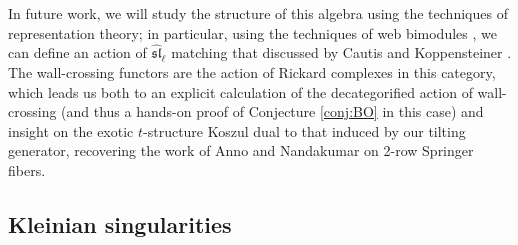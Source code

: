 In future work, we will study the structure of this algebra using the techniques of representation theory; in particular, using the techniques of web bimodules \cite{Webweb}, we can define an action of $\mathfrak{\widehat{sl}}_\ell$ matching that discussed by Cautis and Koppensteiner \cite{CKexotic}.  The wall-crossing functors are the action of Rickard complexes in this category, which leads us both to an explicit calculation of the decategorified action of wall-crossing (and thus a hands-on proof of Conjecture \ref{conj:BO} in this case) and insight on the exotic $t$-structure Koszul dual to that induced by our tilting generator, recovering the work of Anno and Nandakumar \cite{Anno,ANexotic} on 2-row Springer fibers.

\subsection{Kleinian singularities}

